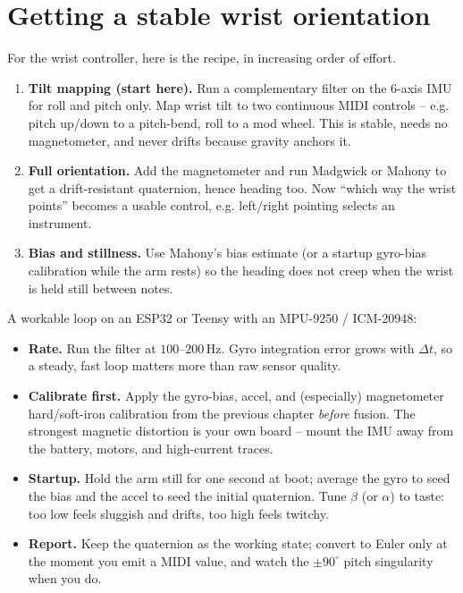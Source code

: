 \section{Getting a stable wrist orientation}
\label{ch36:wrist}

\begin{goalbox}
For the wrist controller, here is the recipe, in increasing order of effort.
\begin{enumerate}
  \item \textbf{Tilt mapping (start here).} Run a complementary filter on the 6-axis IMU
        for roll and pitch only. Map wrist tilt to two continuous MIDI controls -- e.g.
        pitch up/down to a pitch-bend, roll to a mod wheel. This is stable, needs no
        magnetometer, and never drifts because gravity anchors it.
  \item \textbf{Full orientation.} Add the magnetometer and run Madgwick or Mahony to get
        a drift-resistant quaternion, hence heading too. Now ``which way the wrist
        points'' becomes a usable control, e.g. left/right pointing selects an
        instrument.
  \item \textbf{Bias and stillness.} Use Mahony's bias estimate (or a startup
        gyro-bias calibration while the arm rests) so the heading does not creep when the
        wrist is held still between notes.
\end{enumerate}
\end{goalbox}

\begin{buildbox}
A workable loop on an ESP32 or Teensy with an MPU-9250 / ICM-20948:
\begin{itemize}
  \item \textbf{Rate.} Run the filter at $100$--$200$\,Hz. Gyro integration error grows
        with $\Delta t$, so a steady, fast loop matters more than raw sensor quality.
  \item \textbf{Calibrate first.} Apply the gyro-bias, accel, and (especially)
        magnetometer hard/soft-iron calibration from the previous chapter \emph{before}
        fusion. The strongest magnetic distortion is your own board -- mount the IMU away
        from the battery, motors, and high-current traces.
  \item \textbf{Startup.} Hold the arm still for one second at boot; average the gyro to
        seed the bias and the accel to seed the initial quaternion. Tune $\beta$ (or
        $\alpha$) to taste: too low feels sluggish and drifts, too high feels twitchy.
  \item \textbf{Report.} Keep the quaternion as the working state; convert to Euler only
        at the moment you emit a MIDI value, and watch the $\pm 90^\circ$ pitch
        singularity when you do.
\end{itemize}
\end{buildbox}

